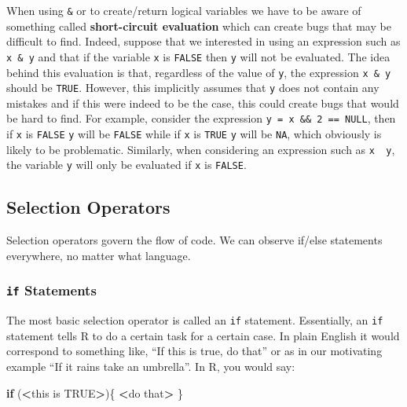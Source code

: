 \documentclass[12pt,]{krantz}
\newenvironment{Shaded}{\begin{snugshade}}{\end{snugshade}}
\newcommand{\OtherTok}[1]{\textcolor[rgb]{0.37,0.37,0.37}{#1}}
\newcommand{\ControlFlowTok}[1]{\textcolor[rgb]{0.27,0.27,0.27}{\textbf{#1}}}
\newcommand{\OperatorTok}[1]{\textcolor[rgb]{0.43,0.43,0.43}{\textbf{#1}}}
\newcommand{\NormalTok}[1]{#1}
\let\BeginKnitrBlock\begin \let\EndKnitrBlock\end
\begin{document}
\BeginKnitrBlock{rmdnote}
When using \texttt{\&} or \texttt{\textbar{}} to create/return logical
variables we have to be aware of something called \textbf{short-circuit
evaluation} which can create bugs that may be difficult to find. Indeed,
suppose that we interested in using an expression such as
\texttt{x\ \&\ y} and that if the variable \texttt{x} is \texttt{FALSE}
then \texttt{y} will not be evaluated. The idea behind this evaluation
is that, regardless of the value of \texttt{y}, the expression
\texttt{x\ \&\ y} should be \texttt{TRUE}. However, this implicitly
assumes that \texttt{y} does not contain any mistakes and if this were
indeed to be the case, this could create bugs that would be hard to
find. For example, consider the expression
\texttt{y\ =\ x\ \&\&\ 2\ ==\ NULL}, then if \texttt{x} is
\texttt{FALSE} \texttt{y} will be \texttt{FALSE} while if \texttt{x} is
\texttt{TRUE} \texttt{y} will be \texttt{NA}, which obviously is likely
to be problematic. Similarly, when considering an expression such as
\texttt{x\ \textbar{}\ y}, the variable \texttt{y} will only be
evaluated if \texttt{x} is \texttt{FALSE}.
\EndKnitrBlock{rmdnote}

\subsection{Selection Operators}\label{selection-operators}

Selection operators govern the flow of code. We can observe if/else
statements everywhere, no matter what language.

\subsubsection{\texorpdfstring{\texttt{if}
Statements}{if Statements}}\label{if-statements}

The most basic selection operator is called an \texttt{if} statement.
Essentially, an \texttt{if} statement tells R to do a certain task for a
certain case. In plain English it would correspond to something like,
``If this is true, do that'' or as in our motivating example ``If it
rains take an umbrella''. In R, you would say:

\begin{Shaded}
\begin{Highlighting}[]
\ControlFlowTok{if}\NormalTok{ (}\OperatorTok{<}\NormalTok{this is }\OtherTok{TRUE}\OperatorTok{>}\NormalTok{)\{}
  \OperatorTok{<}\NormalTok{do that}\OperatorTok{>}
\NormalTok{\}}
\end{Highlighting}
\end{Shaded}
\end{document}
